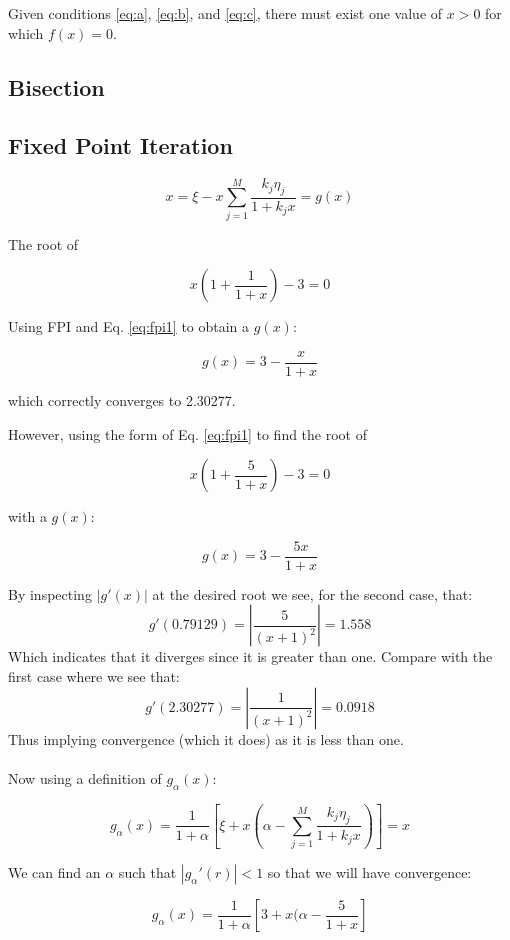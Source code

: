 \documentclass[12pt]{article}
\begin{document}
  Given conditions \ref{eq:a}, \ref{eq:b}, and \ref{eq:c}, there must exist one
  value of $x>0$ for which $f(x) = 0$.

  

  \subsection*{Bisection}

  \subsection*{Fixed Point Iteration}

  \begin{equation}
    \label{eq:fpi1}
    x = \xi - x \sum_{j=1}^M\frac{k_j\eta_j}{1+k_jx}=g(x)
  \end{equation}

  The root of

  $$x(1+\frac{1}{1+x}) - 3= 0 $$

  Using FPI and Eq. \ref{eq:fpi1} to obtain a $g(x)$:

  $$g(x) = 3 - \frac{x}{1+x} $$

  which correctly converges to 2.30277.

  However, using the form of Eq. \ref{eq:fpi1} to find the root of

  $$x(1+\frac{5}{1+x}) - 3 = 0 $$

  with a $g(x)$:
  
  $$ g(x) = 3 - \frac{5x}{1+x} $$

  By inspecting $|g'(x)|$ at the desired root we see, for the second case, that:
  $$g'(0.79129) = |\frac{5}{(x+1)^2}| = 1.558 $$
  Which indicates that it diverges since it is greater than one.
  Compare with the first case where we see that:
  $$g'(2.30277) = |\frac{1}{(x+1)^2}| = 0.0918 $$
  Thus implying convergence (which it does) as it is less than one.\\
  \\
  Now using a definition of $g_\alpha(x)$:
  
  \begin{equation}
    \label{eq:ga}
    g_\alpha(x) = \frac{1}{1+\alpha}\left[\xi+x\left(\alpha-\sum_{j=1}^{M}\frac{k_j\eta_j}{1+k_jx}\right)\right]=x
  \end{equation}

  We can find an $\alpha$ such that $|g_\alpha'(r)|<1$ so that we will have
  convergence:
  
  $$g_\alpha (x) = \frac{1}{1+\alpha}\left[3+x(\alpha-\frac{5}{1+x}\right] $$
\end{document}
